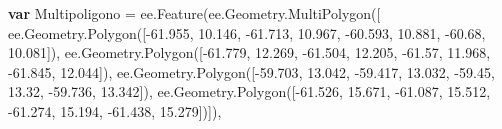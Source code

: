 \documentclass[
  12pt,
  letterpaper,
  twoside]{book}
\newenvironment{Shaded}{\begin{snugshade}}{\end{snugshade}}
\newcommand{\AttributeTok}[1]{\textcolor[rgb]{0.48,0.12,0.64}{#1}}
\newcommand{\FloatTok}[1]{\textcolor[rgb]{0.28,0.53,0.93}{#1}}
\newcommand{\FunctionTok}[1]{\textcolor[rgb]{0.48,0.12,0.64}{#1}}
\newcommand{\KeywordTok}[1]{\textcolor[rgb]{0.00,0.00,0.00}{\textbf{#1}}}
\newcommand{\NormalTok}[1]{#1}
\newcommand{\OperatorTok}[1]{\textcolor[rgb]{0.00,0.00,0.00}{#1}}
\begin{document}
\begin{Shaded}
\begin{Highlighting}[]
\KeywordTok{var}\NormalTok{ Multipoligono }\OperatorTok{=}\NormalTok{ ee}\OperatorTok{.}\FunctionTok{Feature}\NormalTok{(ee}\OperatorTok{.}\AttributeTok{Geometry}\OperatorTok{.}\FunctionTok{MultiPolygon}\NormalTok{([}
\NormalTok{                ee}\OperatorTok{.}\AttributeTok{Geometry}\OperatorTok{.}\FunctionTok{Polygon}\NormalTok{([}\OperatorTok{{-}}\FloatTok{61.955}\OperatorTok{,} \FloatTok{10.146}\OperatorTok{,}         
                                       \OperatorTok{{-}}\FloatTok{61.713}\OperatorTok{,} \FloatTok{10.967}\OperatorTok{,}
                                       \OperatorTok{{-}}\FloatTok{60.593}\OperatorTok{,} \FloatTok{10.881}\OperatorTok{,}
                                           \OperatorTok{{-}}\FloatTok{60.68}\OperatorTok{,} \FloatTok{10.081}\NormalTok{])}\OperatorTok{,}
\NormalTok{                            ee}\OperatorTok{.}\AttributeTok{Geometry}\OperatorTok{.}\FunctionTok{Polygon}\NormalTok{([}\OperatorTok{{-}}\FloatTok{61.779}\OperatorTok{,} \FloatTok{12.269}\OperatorTok{,}     
                                       \OperatorTok{{-}}\FloatTok{61.504}\OperatorTok{,} \FloatTok{12.205}\OperatorTok{,}
                                       \OperatorTok{{-}}\FloatTok{61.57}\OperatorTok{,} \FloatTok{11.968}\OperatorTok{,}
                                       \OperatorTok{{-}}\FloatTok{61.845}\OperatorTok{,} \FloatTok{12.044}\NormalTok{])}\OperatorTok{,}
\NormalTok{                            ee}\OperatorTok{.}\AttributeTok{Geometry}\OperatorTok{.}\FunctionTok{Polygon}\NormalTok{([}\OperatorTok{{-}}\FloatTok{59.703}\OperatorTok{,} \FloatTok{13.042}\OperatorTok{,}         
                                       \OperatorTok{{-}}\FloatTok{59.417}\OperatorTok{,} \FloatTok{13.032}\OperatorTok{,}
                                       \OperatorTok{{-}}\FloatTok{59.45}\OperatorTok{,} \FloatTok{13.32}\OperatorTok{,}
                                       \OperatorTok{{-}}\FloatTok{59.736}\OperatorTok{,} \FloatTok{13.342}\NormalTok{])}\OperatorTok{,}
\NormalTok{                            ee}\OperatorTok{.}\AttributeTok{Geometry}\OperatorTok{.}\FunctionTok{Polygon}\NormalTok{([}\OperatorTok{{-}}\FloatTok{61.526}\OperatorTok{,} \FloatTok{15.671}\OperatorTok{,}          
                                       \OperatorTok{{-}}\FloatTok{61.087}\OperatorTok{,} \FloatTok{15.512}\OperatorTok{,}
                                       \OperatorTok{{-}}\FloatTok{61.274}\OperatorTok{,} \FloatTok{15.194}\OperatorTok{,}
                                       \OperatorTok{{-}}\FloatTok{61.438}\OperatorTok{,} \FloatTok{15.279}\NormalTok{])])}\OperatorTok{,}

\end{Highlighting}
\end{Shaded}
\end{document}
